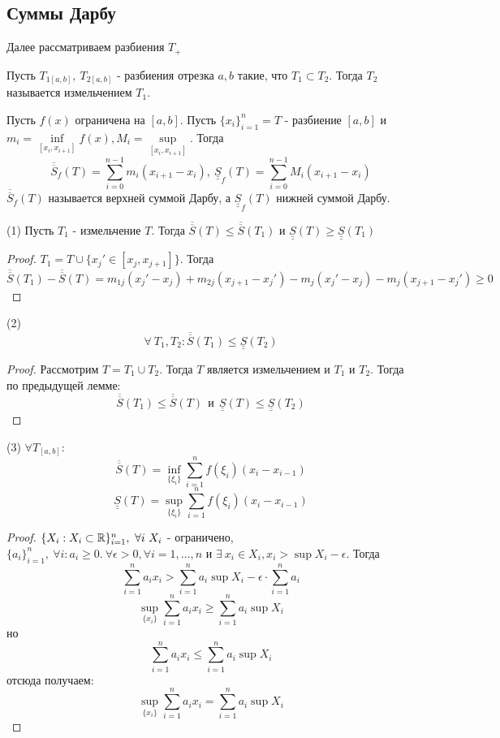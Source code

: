 \subsection{Суммы Дарбу}
Далее рассматриваем разбиения $T_+$
\begin{definition}
    Пусть $T_{1[a,b]},\ T_{2[a,b]}$ - разбиения отрезка ${a,b}$ такие, что $T_1\subset T_2$. Тогда $T_2$ называется измельчением $T_1$.
\end{definition} 
\begin{definition}
    Пусть $f(x)$ ограничена на $[a,b]$. Пусть $\{x_i\}_{i=1}^n=T$ - разбиение $[a,b]$ и $m_i=\inf\limits_{[x_i, x_{i+1}]} f(x), M_i=\sup\limits_{[x_i, x_{i+1}]}$. Тогда 
    \[\overline{\overline{S}}_f(T)=\sum\limits_{i=0}^{n-1}m_i(x_{i+1}-x_i),\ \underline{\underline{S}}_f(T)=\sum\limits_{i=0}^{n-1}M_i(x_{i+1}-x_i)\]
    $\overline{\overline{S}}_f(T)$ называется верхней суммой Дарбу, а $\underline{\underline{S}}_f(T)$ нижней суммой Дарбу.
\end{definition} 
\begin{lemma} (1)
    Пусть $T_1$ - измельчение $T$. Тогда $\overline{\overline{S}}(T)\leq \overline{\overline{S}}(T_1)$ и $\underline{\underline{S}}(T)\geq \underline{\underline{S}}(T_1)$
\end{lemma} 
\begin{proof}
    $T_1=T\cup \{x_j'\in [x_j, x_{j+1}]\}$. Тогда \[\overline{\overline{S}}(T_1)-\overline{\overline{S}}(T)=m_{1j}(x_j'-x_j)+m_{2j}(x_{j+1}-x_j')-m_j(x_j'-x_j)-m_j(x_{j+1}-x_j')\geq 0\]
\end{proof} 
\begin{lemma} (2) 
    \[\forall\ T_1, T_2: \overline{\overline{S}}(T_1)\leq \underline{\underline{S}}(T_2)\]
\end{lemma} 
\begin{proof}
    Рассмотрим $T=T_1\cup T_2$. Тогда $T$ является измельчением и $T_1$ и $T_2$. Тогда по предыдущей лемме:
    \[\overline{\overline{S}}(T_1)\leq \overline{\overline{S}}(T)\ \ \text{и}\ \ \underline{\underline{S}}(T)\leq \underline{\underline{S}}(T_2)\]
\end{proof} 
\begin{lemma} (3) $\forall T_{[a,b]}:$
    \[\overline{\overline{S}}(T)=\inf\limits_{\{\xi_i\}}\sum\limits_{i=1}^{n}f(\xi_i)(x_i-x_{i-1})\]
    \[\underline{\underline{S}}(T)=\sup\limits_{\{\xi_i\}}\sum\limits_{i=1}^{n}f(\xi_i)(x_i-x_{i-1})\]
\end{lemma} 
\begin{proof}
    $\{X_i: X_i\subset \mathbb{R}\}_{i=1}^n,\ \forall i\ X_i$ - ограничено,\\
    $\{a_i\}_{i=1}^n,\ \forall i: a_i\geq 0.\ \forall \epsilon>0, \forall i=1,\dots,n$ и $\exists\ x_i\in X_i, x_i>\sup X_i-\epsilon$. Тогда 
    \[\sum\limits_{i=1}^{n}a_i x_i>\sum\limits_{i=1}^{n}a_i \sup X_i-\epsilon\cdot \sum\limits_{i=1}^{n}a_i\] 
    \[\sup\limits_{\{x_i\}} \sum\limits_{i=1}^{n}a_i x_i\geq \sum\limits_{i=1}^{n}a_i \sup X_i\]
    но 
    \[\sum\limits_{i=1}^{n}a_i x_i \leq \sum\limits_{i=1}^{n} a_i\sup X_i\]
    отсюда получаем:
    \[\sup\limits_{\{x_i\}} \sum\limits_{i=1}^{n}a_i x_i=\sum\limits_{i=1}^{n}a_i \sup X_i\]
\end{proof} 
